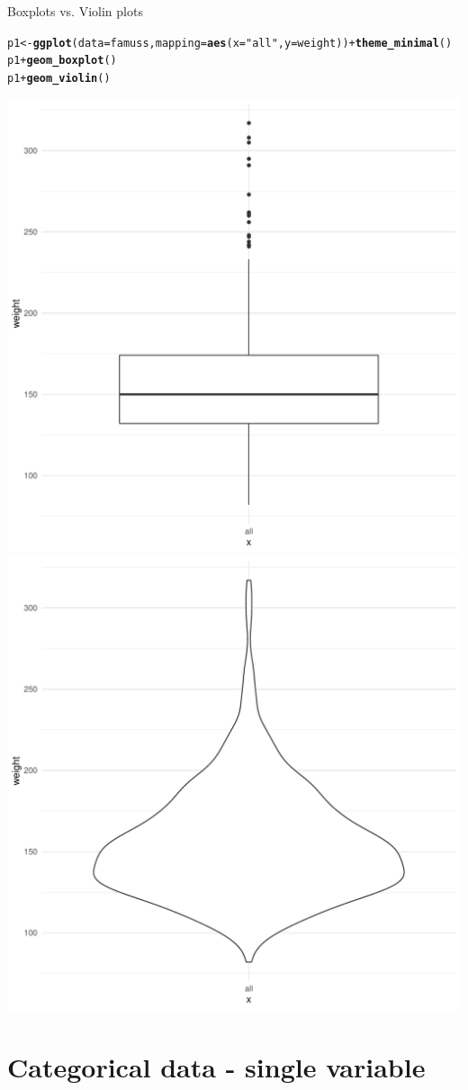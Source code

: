 \documentclass[10pt,handout]{beamer}\usepackage[]{graphicx}\usepackage[]{color}
\makeatletter
\newcommand{\hlstr}[1]{\textcolor[rgb]{0.192,0.494,0.8}{#1}}%
\newcommand{\hlopt}[1]{\textcolor[rgb]{0,0,0}{#1}}%
\newcommand{\hlstd}[1]{\textcolor[rgb]{0.345,0.345,0.345}{#1}}%
\newcommand{\hlkwb}[1]{\textcolor[rgb]{0.69,0.353,0.396}{#1}}%
\newcommand{\hlkwc}[1]{\textcolor[rgb]{0.333,0.667,0.333}{#1}}%
\newcommand{\hlkwd}[1]{\textcolor[rgb]{0.737,0.353,0.396}{\textbf{#1}}}%
\newenvironment{kframe}{%
 \def\at@end@of@kframe{}%
 \ifinner\ifhmode%
  \def\at@end@of@kframe{\end{minipage}}%
  \begin{minipage}{\columnwidth}%
 \fi\fi%
 \def\FrameCommand##1{\hskip\@totalleftmargin \hskip-\fboxsep
 \colorbox{shadecolor}{##1}\hskip-\fboxsep
     \hskip-\linewidth \hskip-\@totalleftmargin \hskip\columnwidth}%
 \MakeFramed {\advance\hsize-\width
   \@totalleftmargin\z@ \linewidth\hsize
   \@setminipage}}%
 {\par\unskip\endMakeFramed%
 \at@end@of@kframe}
\newenvironment{knitrout}{}{} %
\makeatother
\begin{document}
\begin{frame}[fragile]{Boxplots vs. Violin plots}
	
\begin{knitrout}\scriptsize
{}\color{fgcolor}\begin{kframe}
\begin{alltt}
\hlstd{p1} \hlkwb{<-} \hlkwd{ggplot}\hlstd{(}\hlkwc{data} \hlstd{= famuss,} \hlkwc{mapping} \hlstd{=} \hlkwd{aes}\hlstd{(}\hlkwc{x} \hlstd{=} \hlstr{"all"}\hlstd{,} \hlkwc{y} \hlstd{= weight))} \hlopt{+} \hlkwd{theme_minimal}\hlstd{()}
\hlstd{p1} \hlopt{+} \hlkwd{geom_boxplot}\hlstd{()}
\hlstd{p1} \hlopt{+} \hlkwd{geom_violin}\hlstd{()}
\end{alltt}
\end{kframe}

{\centering \includegraphics[width=0.45\linewidth]{figure/unnamed-chunk-2-1} 
\includegraphics[width=0.45\linewidth]{figure/unnamed-chunk-2-2} 

}


\end{knitrout}
	
\end{frame}

		
		\hypertarget{categorical-data}{%
	\section{Categorical data - single variable}\label{categorical-data}}
		
\end{document}
